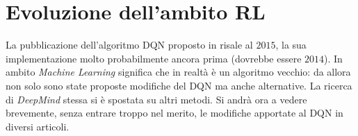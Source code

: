 \documentclass[twoside,twocolumn,10pt]{extarticle}
\theoremstyle{definition}
\begin{document}

		

\section{Evoluzione dell'ambito RL}\label{sec:evoalg}
	La pubblicazione dell'algoritmo DQN proposto in \cite{bib:dqn} risale al $2015$, la sua implementazione molto probabilmente ancora prima (dovrebbe essere $2014$). In ambito \textit{Machine Learning} significa che in realtà è un algoritmo vecchio: da allora non solo sono state proposte modifiche del DQN ma anche alternative. La ricerca di \textit{DeepMind} stessa si è spostata su altri metodi.	Si andrà ora a vedere brevemente, senza entrare troppo nel merito, le modifiche apportate al DQN in diversi articoli.
	
\end{document}
